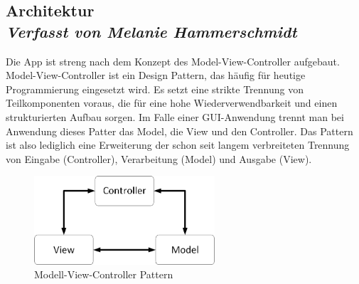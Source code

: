 \subsection[Architektur]{Architektur
 \\ \textnormal{\small{\textit {Verfasst von Melanie Hammerschmidt}}}}
 
Die App ist streng nach dem Konzept des Model-View-Controller aufgebaut.
\\
Model-View-Controller ist ein Design Pattern, das häufig für heutige Programmierung eingesetzt wird. Es setzt eine strikte Trennung von Teilkomponenten voraus, die für eine hohe Wiederverwendbarkeit und einen strukturierten Aufbau sorgen. Im Falle einer GUI-Anwendung trennt man bei Anwendung dieses Patter das Model, die View und den Controller. Das Pattern ist also lediglich eine Erweiterung der schon seit langem verbreiteten Trennung von Eingabe (Controller), Verarbeitung (Model) und Ausgabe (View). 

\begin{figure}[h]
\centering
\includegraphics[width=0.6\textwidth]{ref/images/mvc.png}
\caption[Modell-View-Controller Pattern]{Modell-View-Controller Pattern}
\label{fig:MVC}
\end{figure} 

